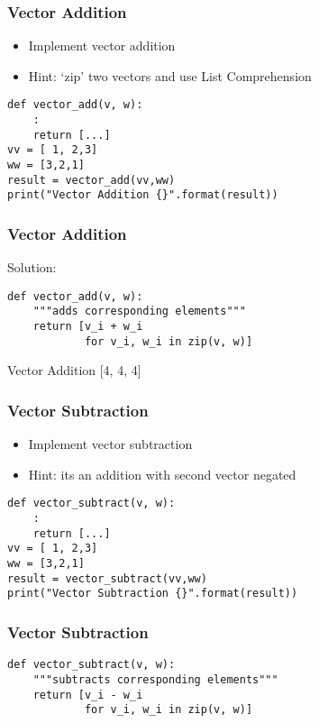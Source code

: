 \begin{frame}[fragile]\frametitle{Vector Addition}
\begin{itemize}
\item Implement vector addition
\item Hint: `zip' two vectors and use List Comprehension
\end{itemize}
\begin{lstlisting}
def vector_add(v, w):
	:
	return [...]
vv = [ 1, 2,3]
ww = [3,2,1]
result = vector_add(vv,ww)
print("Vector Addition {}".format(result))
\end{lstlisting}
\end{frame}


\begin{frame}[fragile]\frametitle{Vector Addition}
Solution:
\begin{lstlisting}
def vector_add(v, w):
    """adds corresponding elements"""
    return [v_i + w_i
            for v_i, w_i in zip(v, w)]
\end{lstlisting}
Vector Addition [4, 4, 4]
\end{frame}

\begin{frame}[fragile]\frametitle{Vector Subtraction}
\begin{itemize}
\item Implement vector subtraction
\item Hint: its an addition with second vector negated
\end{itemize}
\begin{lstlisting}
def vector_subtract(v, w):
	:
	return [...]
vv = [ 1, 2,3]
ww = [3,2,1]
result = vector_subtract(vv,ww)
print("Vector Subtraction {}".format(result))
\end{lstlisting}
\end{frame}

\begin{frame}[fragile]\frametitle{Vector Subtraction}

\begin{lstlisting}
def vector_subtract(v, w):
    """subtracts corresponding elements"""
    return [v_i - w_i
            for v_i, w_i in zip(v, w)]
\end{lstlisting}
\end{frame}

